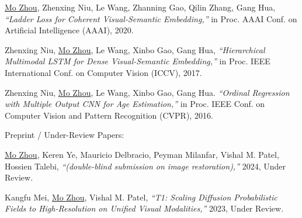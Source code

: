 \documentclass[10pt,margin,line,pifont,palatino,courier]{res}
\begin{document}
\begin{resume}
\begin{enumerate}[noitemsep, leftmargin=*, label={[C0{\arabic*}]}]
\item  \underline{Mo Zhou},
\reversemarginpar{}
Zhenxing Niu, Le Wang, Zhanning Gao, Qilin Zhang, Gang Hua,
\textit{``Ladder Loss for Coherent Visual-Semantic Embedding,''}
in Proc. AAAI Conf. on Artificial Intelligence (AAAI), 2020.

\item Zhenxing Niu,
\reversemarginpar{}
\underline{Mo Zhou}, Le Wang, Xinbo Gao, Gang Hua,
\textit{``Hierarchical Multimodal LSTM for Dense Visual-Semantic Embedding,''}
in Proc. IEEE International Conf. on Computer Vision (ICCV), 2017.

\item Zhenxing Niu,
\reversemarginpar{}
\underline{Mo Zhou}, Le Wang, Xinbo Gao, Gang Hua.
\textit{``Ordinal Regression with Multiple Output CNN for Age Estimation,''}
in Proc. IEEE Conf. on Computer Vision and Pattern Recognition (CVPR), 2016.

\end{enumerate}

	{\sc Preprint / Under-Review Papers:}\\

\begin{enumerate}[noitemsep, leftmargin=*, label={[X0{\arabic*}]}]

\item \underline{Mo Zhou}, Keren Ye, Mauricio Delbracio, Peyman Milanfar, Vishal M. Patel, Hossien Talebi,
\textit{``(double-blind submission on image restoration),''}
2024, Under Review.


\item Kangfu Mei, \underline{Mo Zhou}, Vishal M. Patel,
\reversemarginpar{}
\textit{``T1: Scaling Diffusion Probabilistic Fields to High-Resolution on Unified Visual Modalities,''}
2023, Under Review.


\end{enumerate}
\end{resume}
\end{document}
